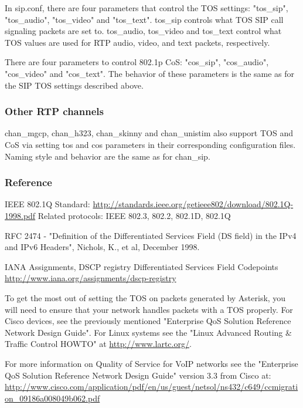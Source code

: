 In sip.conf, there are four parameters that control the TOS settings:
"tos\_sip", "tos\_audio", "tos\_video" and "tos\_text". tos\_sip controls
what TOS SIP call signaling packets are set to. tos\_audio, tos\_video
and tos\_text control what TOS values are used for RTP audio, video, and text
packets, respectively.

There are four parameters to control 802.1p CoS: "cos\_sip", "cos\_audio",
"cos\_video" and "cos\_text". The behavior of these parameters is the
same as for the SIP TOS settings described above.

\subsubsection{Other RTP channels}

chan\_mgcp, chan\_h323, chan\_skinny and chan\_unistim also support TOS and
CoS via setting tos and cos parameters in their corresponding configuration
files. Naming style and behavior are the same as for chan\_sip.

\subsubsection{Reference}

IEEE 802.1Q Standard:
\url{http://standards.ieee.org/getieee802/download/802.1Q-1998.pdf}
Related protocols: IEEE 802.3, 802.2, 802.1D, 802.1Q

RFC 2474 - "Definition of the Differentiated Services Field
(DS field) in the IPv4 and IPv6 Headers", Nichols, K., et al,
December 1998.

IANA Assignments, DSCP registry
Differentiated Services Field Codepoints
\url{http://www.iana.org/assignments/dscp-registry}

To get the most out of setting the TOS on packets generated by
Asterisk, you will need to ensure that your network handles packets
with a TOS properly.  For Cisco devices, see the previously mentioned
"Enterprise QoS Solution Reference Network Design Guide".  For Linux
systems see the "Linux Advanced Routing \& Traffic Control HOWTO" at 
\url{http://www.lartc.org/}.

For more information on Quality of
Service for VoIP networks see the "Enterprise QoS Solution Reference
Network Design Guide" version 3.3 from Cisco at:
\url{http://www.cisco.com/application/pdf/en/us/guest/netsol/ns432/c649/ccmigration\_09186a008049b062.pdf}
